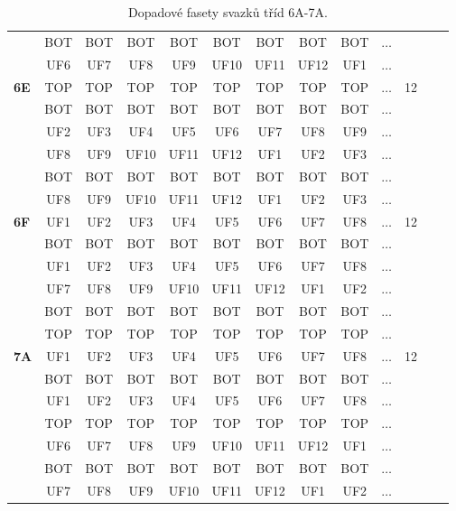 \begin{table}[h!]
\begin{tabular}{|l|c|c|c|c|c|c|c|c|c|c|c|c|}
 & BOT & BOT & BOT & BOT & BOT & BOT & BOT & BOT & $\dots$ & \\
 & UF6 & UF7 & UF8 & UF9 & UF10 & UF11 & UF12 & UF1 & $\dots$ & \\
\hline \hline
\textbf{6E} & TOP & TOP & TOP & TOP & TOP & TOP & TOP & TOP & $\dots$ & 12\\
 & BOT & BOT & BOT & BOT & BOT & BOT & BOT & BOT & $\dots$ & \\
 & UF2 & UF3 & UF4 & UF5 & UF6 & UF7 & UF8 & UF9 & $\dots$ & \\
 & UF8 & UF9 & UF10 & UF11 & UF12 & UF1 & UF2 & UF3 & $\dots$ & \\
 & BOT & BOT & BOT & BOT & BOT & BOT & BOT & BOT & $\dots$ & \\
 & UF8 & UF9 & UF10 & UF11 & UF12 & UF1 & UF2 & UF3 & $\dots$ & \\
\hline \hline
\textbf{6F} & UF1 & UF2 & UF3 & UF4 & UF5 & UF6 & UF7 & UF8 & $\dots$ & 12\\
 & BOT & BOT & BOT & BOT & BOT & BOT & BOT & BOT & $\dots$ & \\
 & UF1 & UF2 & UF3 & UF4 & UF5 & UF6 & UF7 & UF8 & $\dots$ & \\
 & UF7 & UF8 & UF9 & UF10 & UF11 & UF12 & UF1 & UF2 & $\dots$ & \\
 & BOT & BOT & BOT & BOT & BOT & BOT & BOT & BOT & $\dots$ & \\
 & TOP & TOP & TOP & TOP & TOP & TOP & TOP & TOP & $\dots$ & \\
\hline \hline
\textbf{7A} & UF1 & UF2 & UF3 & UF4 & UF5 & UF6 & UF7 & UF8 & $\dots$ & 12\\
 & BOT & BOT & BOT & BOT & BOT & BOT & BOT & BOT & $\dots$ & \\
 & UF1 & UF2 & UF3 & UF4 & UF5 & UF6 & UF7 & UF8 & $\dots$ & \\
 & TOP & TOP & TOP & TOP & TOP & TOP & TOP & TOP & $\dots$ & \\
 & UF6 & UF7 & UF8 & UF9 & UF10 & UF11 & UF12 & UF1 & $\dots$ & \\
 & BOT & BOT & BOT & BOT & BOT & BOT & BOT & BOT & $\dots$ & \\
 & UF7 & UF8 & UF9 & UF10 & UF11 & UF12 & UF1 & UF2 & $\dots$ & \\
\hline 
\end{tabular}
\caption{Dopadové fasety svazků tříd 6A-7A.}
\label{table:TableClasses2}
\end{table}

